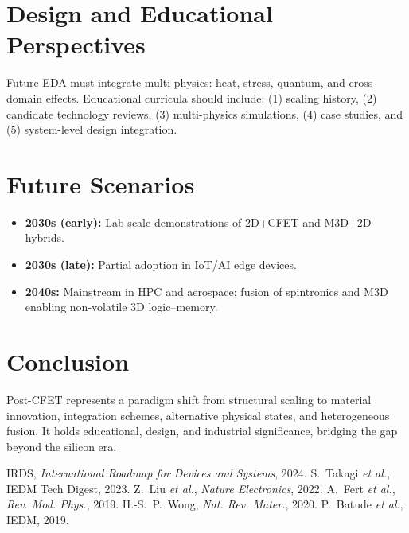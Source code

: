 \documentclass[conference]{IEEEtran}
\begin{document}
\section{Design and Educational Perspectives}
Future EDA must integrate multi-physics: heat, stress, quantum, and cross-domain effects.
Educational curricula should include: (1) scaling history, (2) candidate technology reviews, (3) multi-physics simulations, (4) case studies, and (5) system-level design integration.

\section{Future Scenarios}
\begin{itemize}
  \item \textbf{2030s (early):} Lab-scale demonstrations of 2D+CFET and M3D+2D hybrids.
  \item \textbf{2030s (late):} Partial adoption in IoT/AI edge devices.
  \item \textbf{2040s:} Mainstream in HPC and aerospace; fusion of spintronics and M3D enabling non-volatile 3D logic–memory.
\end{itemize}

\section{Conclusion}
Post-CFET represents a paradigm shift from structural scaling to material innovation, integration schemes, alternative physical states, and heterogeneous fusion. It holds educational, design, and industrial significance, bridging the gap beyond the silicon era.

\begin{thebibliography}{00}
 IRDS, \emph{International Roadmap for Devices and Systems}, 2024.
 S.~Takagi \emph{et al.}, IEDM Tech Digest, 2023.
 Z.~Liu \emph{et al.}, \emph{Nature Electronics}, 2022.
 A.~Fert \emph{et al.}, \emph{Rev. Mod. Phys.}, 2019.
 H.-S.~P.~Wong, \emph{Nat. Rev. Mater.}, 2020.
 P.~Batude \emph{et al.}, IEDM, 2019.
\end{thebibliography}

\end{document}
